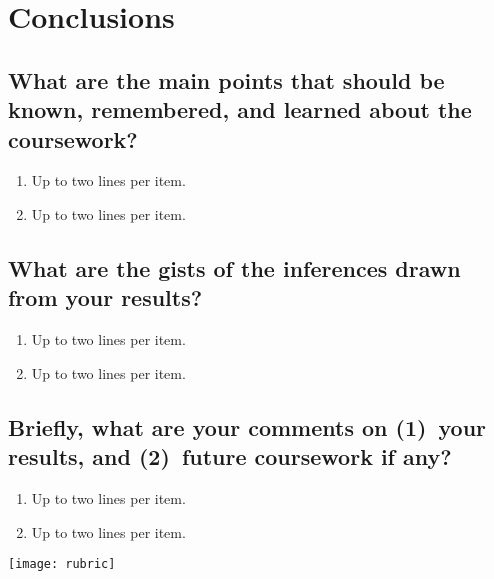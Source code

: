 \section{Conclusions}
\label{sec:conc}

\subsection{What are the main points that should be known, remembered, and learned about the coursework?}
\begin{enumerate}
	\item Up to two lines per item.
	\item Up to two lines per item.
\end{enumerate}

\subsection{What are the gists of the inferences drawn from your results?}
\begin{enumerate}
	\item Up to two lines per item.
	\item Up to two lines per item.
\end{enumerate}

\subsection{Briefly, what are your comments on (1)~your results, and  (2)~future coursework if any?}
\begin{enumerate}
	\item Up to two lines per item.
	\item Up to two lines per item.
\end{enumerate}	




\newpage
\begin{figure*}[!t]
	\texttt{[image: rubric]} 
\end{figure*}
\cleardoublepage

